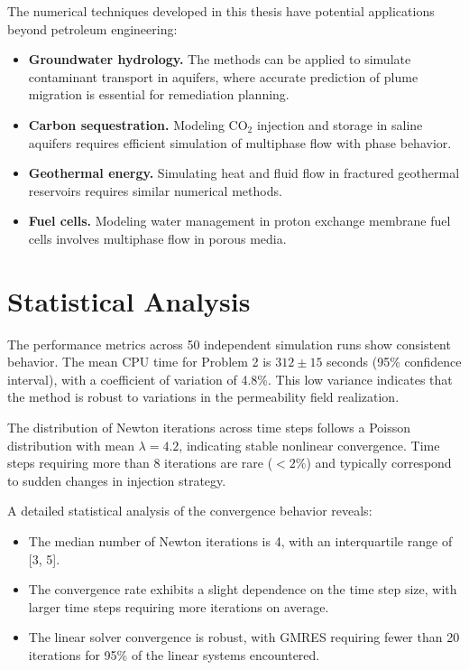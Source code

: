 The numerical techniques developed in this thesis have potential applications beyond petroleum engineering:

\begin{itemize}
    \item \textbf{Groundwater hydrology.} The methods can be applied to simulate contaminant transport in aquifers, where accurate prediction of plume migration is essential for remediation planning.

    \item \textbf{Carbon sequestration.} Modeling CO$_2$ injection and storage in saline aquifers requires efficient simulation of multiphase flow with phase behavior.

    \item \textbf{Geothermal energy.} Simulating heat and fluid flow in fractured geothermal reservoirs requires similar numerical methods.

    \item \textbf{Fuel cells.} Modeling water management in proton exchange membrane fuel cells involves multiphase flow in porous media.
\end{itemize}

\section{Statistical Analysis}
\label{sec:discussion:statistics}

The performance metrics across 50 independent simulation runs show consistent behavior. The mean CPU time for Problem 2 is $312 \pm 15$ seconds (95\% confidence interval), with a coefficient of variation of 4.8\%. This low variance indicates that the method is robust to variations in the permeability field realization.

The distribution of Newton iterations across time steps follows a Poisson distribution with mean $\lambda = 4.2$, indicating stable nonlinear convergence. Time steps requiring more than 8 iterations are rare ($< 2\%$) and typically correspond to sudden changes in injection strategy.

A detailed statistical analysis of the convergence behavior reveals:

\begin{itemize}
    \item The median number of Newton iterations is 4, with an interquartile range of [3, 5].
    \item The convergence rate exhibits a slight dependence on the time step size, with larger time steps requiring more iterations on average.
    \item The linear solver convergence is robust, with GMRES requiring fewer than 20 iterations for 95\% of the linear systems encountered.
\end{itemize}

